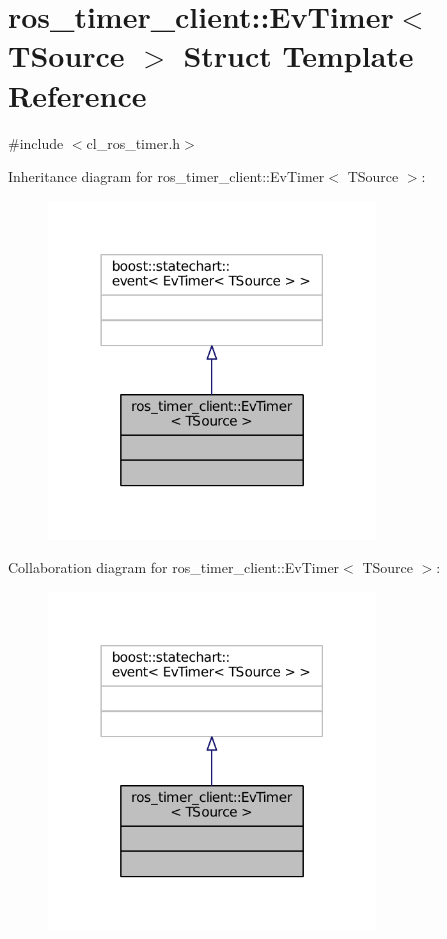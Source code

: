 \hypertarget{structros__timer__client_1_1EvTimer}{}\section{ros\+\_\+timer\+\_\+client\+:\+:Ev\+Timer$<$ T\+Source $>$ Struct Template Reference}
\label{structros__timer__client_1_1EvTimer}


{\ttfamily \#include $<$cl\+\_\+ros\+\_\+timer.\+h$>$}



Inheritance diagram for ros\+\_\+timer\+\_\+client\+:\+:Ev\+Timer$<$ T\+Source $>$\+:
\nopagebreak
\begin{figure}[H]
\begin{center}
\leavevmode
\includegraphics[width=246pt]{structros__timer__client_1_1EvTimer__inherit__graph}
\end{center}
\end{figure}


Collaboration diagram for ros\+\_\+timer\+\_\+client\+:\+:Ev\+Timer$<$ T\+Source $>$\+:
\nopagebreak
\begin{figure}[H]
\begin{center}
\leavevmode
\includegraphics[width=246pt]{structros__timer__client_1_1EvTimer__coll__graph}
\end{center}
\end{figure}


